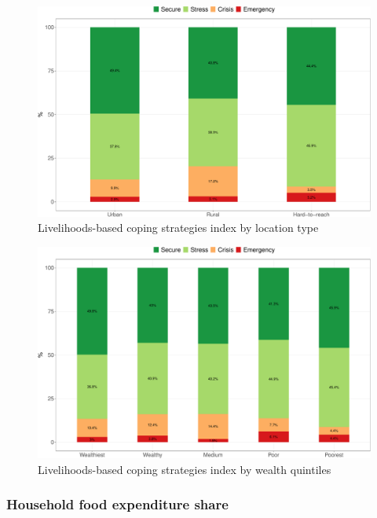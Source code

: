 \documentclass[12pt,a4paper]{article}
\begin{document}
\newpage

\begin{figure}[H]

{\centering \includegraphics{kayahReport_files/figure-latex/lcsi1plot-1} 

}

\caption{Livelihoods-based coping strategies index by location type}\label{fig:lcsi1plot}
\end{figure}

\begin{figure}[H]

{\centering \includegraphics{kayahReport_files/figure-latex/lcsi2plot-1} 

}

\caption{Livelihoods-based coping strategies index by wealth quintiles}\label{fig:lcsi2plot}
\end{figure}

\hypertarget{hfes-results}{%
\subsubsection{Household food expenditure share}\label{hfes-results}}
\end{document}
